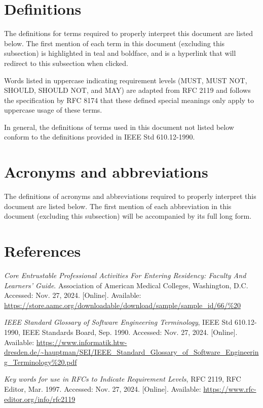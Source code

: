 \documentclass[letterpaper,article,oneside]{memoir}
\begin{document}
\section{Definitions}

The definitions for terms required to properly interpret this document are listed below.
The first mention of each term in this document (excluding this subsection) is highlighted in teal and boldface, and is a hyperlink that will redirect to this subsection when clicked.

Words listed in uppercase indicating requirement levels (MUST, MUST NOT, SHOULD, SHOULD NOT, and MAY) are adapted from RFC 2119 and follows the specification by RFC 8174 that these defined special meanings only apply to uppercase usage of these terms.

In general, the definitions of terms used in this document not listed below conform to the definitions provided in IEEE Std 610.12-1990.

\printglossary

\section{Acronyms and abbreviations}

The definitions of acronyms and abbreviations required to properly interpret this document are listed below.
The first mention of each abbreviation in this document (excluding this subsection) will be accompanied by its full long form.

\printabbreviations

\section{References}

\textit{Core Entrustable Professional Activities For Entering Residency: Faculty And Learners' Guide}. Association of American Medical Colleges, Washington, D.C. Accessed: Nov. 27, 2024. [Online]. Available: \url{https://store.aamc.org/downloadable/download/sample/sample\_id/66/\%20}

\textit{IEEE Standard Glossary of Software Engineering Terminology}, IEEE Std 610.12-1990, IEEE Standards Board, Sep. 1990. Accessed: Nov. 27, 2024. [Online]. Available: \url{https://www.informatik.htw-dresden.de/~hauptman/SEI/IEEE\_Standard\_Glossary\_of\_Software\_Engineering\_Terminology\%20.pdf}

\textit{Key words for use in RFCs to Indicate Requirement Levels}, RFC 2119, RFC Editor, Mar. 1997. Accessed: Nov. 27, 2024. [Online]. Available: \url{https://www.rfc-editor.org/info/rfc2119}
\end{document}
